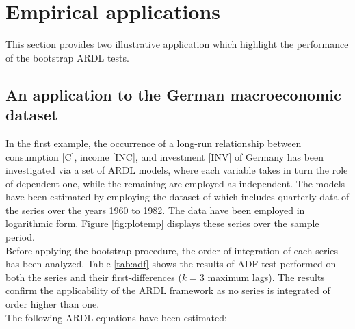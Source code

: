 \section{Empirical applications}\label{sec:app}
This section provides two illustrative application which highlight the performance of the bootstrap ARDL tests.
\subsection{An application to the German macroeconomic dataset}
In the first example, the occurrence of a long-run relationship between consumption [C], income [INC], and investment [INV] of Germany has been investigated via a set of ARDL models, where each variable takes in turn the role of dependent one, while the remaining are employed as independent.
   The models have been estimated by employing the dataset of \citet{lutkepohl2005} which includes quarterly data of the series over the years 1960 to 1982.
    The data have been employed in logarithmic form. Figure \ref{fig:plotemp} displays these series over the sample period.\\
    Before applying the bootstrap procedure, the order of integration of each series has been analyzed. Table \ref{tab:adf} shows the results of ADF test performed  on  both the series and their first-differences ($k=3$ maximum lags). The results confirm the applicability of the ARDL framework as no series is integrated of order higher than one.\\
    The following ARDL equations have been estimated:
